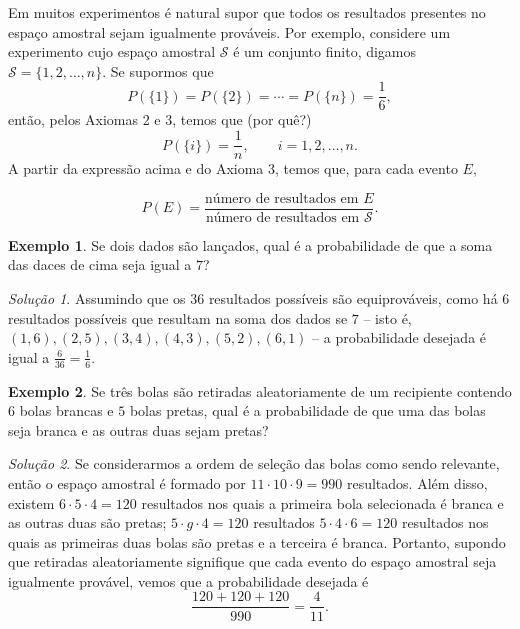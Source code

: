 \documentclass[]{book}
\theoremstyle{definition}
\theoremstyle{definition}
\newtheorem{example}{Exemplo}[chapter]
\theoremstyle{definition}
\theoremstyle{remark}
\newtheorem*{solution}{Solução}
\begin{document}
Em muitos experimentos é natural supor que todos os resultados presentes no espaço amostral sejam igualmente prováveis.
Por exemplo, considere um experimento cujo espaço amostral \(\mathcal{S}\) é um conjunto finito, digamos \(\mathcal{S}=\{1,2,\ldots, n\}\).
Se supormos que
\[P(\{1\})= P(\{2\})= \cdots = P(\{n\})= \frac{1}{6},\]
então, pelos Axiomas 2 e 3, temos que (por quê?)
\[P(\{i\})=\frac{1}{n}, \qquad i=1,2,\ldots, n.\]
A partir da expressão acima e do Axioma 3, temos que, para cada evento \(E\),

\[P(E)=\frac{\text{número de resultados em }E}{\text{número de resultados em } \mathcal{S}}.\]

\begin{example}
\protect\hypertarget{exm:unnamed-chunk-103}{}{\label{exm:unnamed-chunk-103} }Se dois dados são lançados, qual é a probabilidade de que a soma das daces de cima seja igual a \(7\)?
\end{example}

\begin{solution}
\iffalse{} {Solução. } \fi{}Assumindo que os \(36\) resultados possíveis são equiprováveis, como há \(6\) resultados possíveis que resultam na soma dos dados se \(7\) -- isto é, \((1,6), (2,5), (3,4), (4,3), (5,2), (6,1)\) -- a probabilidade desejada é igual a \(\frac{6}{36}=\frac{1}{6}.\)
\end{solution}

\begin{example}
\protect\hypertarget{exm:unnamed-chunk-105}{}{\label{exm:unnamed-chunk-105} }Se três bolas são retiradas aleatoriamente de um recipiente contendo \(6\) bolas brancas e \(5\) bolas pretas, qual é a probabilidade de que uma das bolas seja branca e as outras duas sejam pretas?
\end{example}

\begin{solution}
\iffalse{} {Solução. } \fi{}Se considerarmos a ordem de seleção das bolas como sendo relevante, então o espaço amostral é formado por \(11\cdot 10\cdot 9 = 990\) resultados.
Além disso, existem \(6\cdot 5\cdot 4 = 120\) resultados nos quais a primeira bola selecionada é branca e as outras duas são pretas; \(5\cdot g\cdot 4 = 120\) resultados \(5\cdot 4\cdot 6 = 120\) resultados nos quais as primeiras duas bolas são pretas e a terceira é branca.
Portanto, supondo que retiradas aleatoriamente signifique que cada evento do espaço amostral seja igualmente provável, vemos que a probabilidade desejada é
\[\frac{120 + 120 + 120}{990}=\frac{4}{11}.\]
\end{solution}
\end{document}
